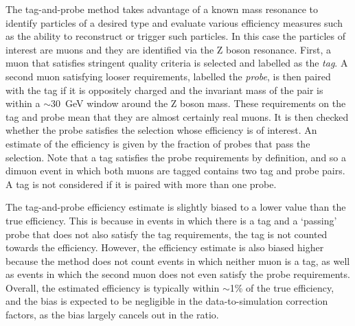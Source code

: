 The tag-and-probe method takes advantage of a known mass resonance to identify 
particles of a desired type and evaluate various efficiency measures such as 
the ability to reconstruct or trigger such particles. In this case the 
particles of interest are muons and they are identified via the Z boson 
resonance. 
First, a muon that satisfies stringent quality criteria is selected and 
labelled as the \textit{tag}. A second muon satisfying looser requirements, 
labelled the \textit{probe}, is then paired with the tag if it is oppositely 
charged and the invariant mass of the pair is within a $\sim$30~GeV window 
around the Z boson mass. These requirements on the tag and probe mean that they 
are almost certainly real muons. It is then checked whether the probe satisfies 
the selection whose efficiency is of interest. An estimate of the efficiency is 
given by the fraction of probes that pass the selection. Note that a tag 
satisfies the probe requirements by definition, and so a dimuon event in which 
both muons are tagged contains two tag and probe pairs. A tag is not considered 
if it is paired with more than one probe.

The tag-and-probe efficiency estimate is slightly biased to a lower value than 
the true efficiency. This is because in events in which there is a tag and a 
`passing' probe that does not also satisfy the tag requirements, the tag is not 
counted towards the efficiency. However, the efficiency estimate is also biased 
higher because the method does not count events in which neither muon is a tag, 
as well as events in which the second muon does not even satisfy the probe 
requirements. Overall, the estimated efficiency is typically within $\sim$1\% 
of the true efficiency, and the bias is expected to be negligible in the 
data-to-simulation correction factors, as the bias largely cancels out in the 
ratio.

